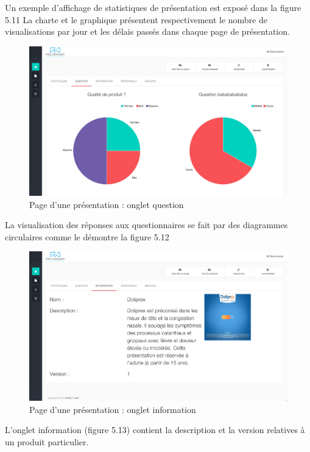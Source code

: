 \documentclass[12pt, ChapStyle1, oneside]{./Styles/Dea_Gsm}
\begin{document}
Un exemple d'affichage de statistiques de présentation est exposé dans la figure 5.11 La charte et le graphique présentent respectivement le nombre de visualisations par jour et les délais passés dans chaque page de présentation.

\begin{figure}[H]
    \centering
    \includegraphics[width=6in]{screenshots/web/prezquestion}
    \caption{Page d'une présentation : onglet question}

\end{figure}

La visualisation des réponses aux questionnaires se fait par des diagrammes circulaires comme le démontre la figure 5.12

\begin{figure}[H]
    \centering
    \includegraphics[width=6in]{screenshots/web/prezinfo}
    \caption{Page d'une présentation : onglet information}

\end{figure}

L'onglet information (figure 5.13) contient la description et la version relatives à un produit  particulier.
\end{document}
